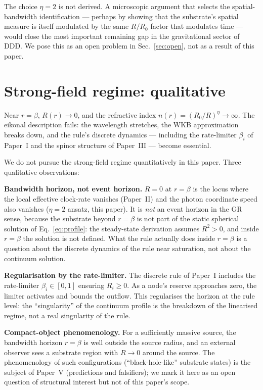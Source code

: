 \documentclass[11pt,a4paper]{article}
\begin{document}
The choice $\eta = 2$ is not derived. A microscopic argument
that selects the spatial-bandwidth identification --- perhaps by
showing that the substrate's spatial measure is itself modulated
by the same $R/R_0$ factor that modulates time --- would close
the most important remaining gap in the gravitational sector of
DDD. We pose this as an open problem in
Sec.~\ref{sec:open}, not as a result of this paper.

\section{Strong-field regime: qualitative}
\label{sec:strong}

Near $r = \beta$, $R(r) \to 0$, and the refractive index
$n(r) = (R_0/R)^\eta \to \infty$. The eikonal description
fails: the wavelength stretches, the WKB approximation breaks
down, and the rule's discrete dynamics --- including the
rate-limiter $\beta_i$ of Paper~I and the spinor structure of
Paper~III --- become essential.

We do not pursue the strong-field regime quantitatively in this
paper. Three qualitative observations:

\textbf{Bandwidth horizon, not event horizon.}
$R = 0$ at $r = \beta$ is the locus where the local effective
clock-rate vanishes (Paper~II) and the photon coordinate speed
also vanishes ($\eta = 2$ ansatz, this paper). It is
\emph{not} an event horizon in the GR sense, because the
substrate beyond $r = \beta$ is not part of the static spherical
solution of Eq.~\eqref{eq:profile}: the steady-state derivation
assumes $R^2 > 0$, and inside $r = \beta$ the solution is not
defined. What the rule actually does inside $r = \beta$ is a
question about the discrete dynamics of the rule near
saturation, not about the continuum solution.

\textbf{Regularisation by the rate-limiter.}
The discrete rule of Paper~I includes the rate-limiter
$\beta_i \in [0, 1]$ ensuring $R_i \ge 0$. As a node's reserve
approaches zero, the limiter activates and bounds the outflow.
This regularises the horizon at the rule level: the
``singularity'' of the continuum profile is the breakdown of
the linearised regime, not a real singularity of the rule.

\textbf{Compact-object phenomenology.}
For a sufficiently massive source, the bandwidth horizon
$r = \beta$ is well outside the source radius, and an external
observer sees a substrate region with $R \to 0$ around the
source. The phenomenology of such configurations
(``black-hole-like'' substrate states) is the subject of
Paper~V (predictions and falsifiers); we mark it here as an
open question of structural interest but not of this paper's
scope.
\end{document}
